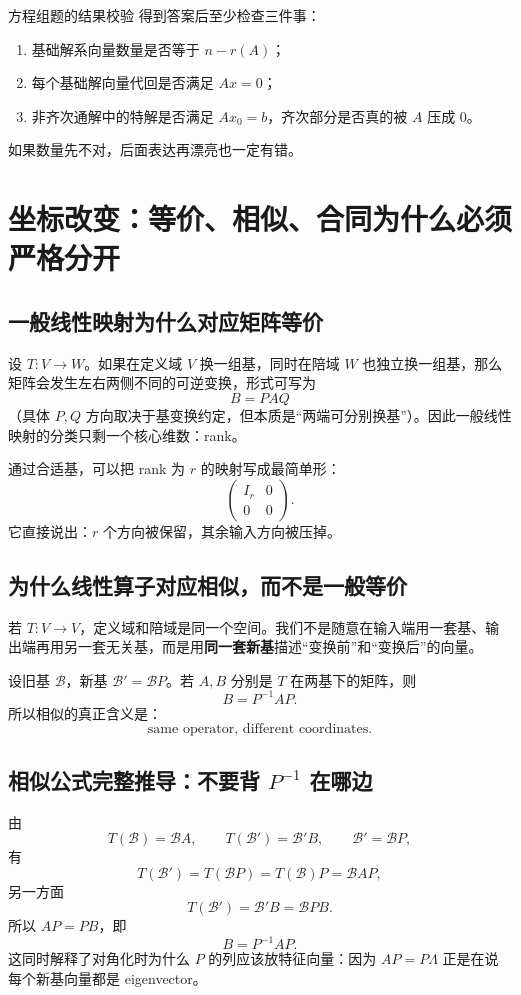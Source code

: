\documentclass[11pt,a4paper,openany]{ctexbook}
\newcommand{\key}[1]{\textbf{\color{deep}#1}}
\begin{document}
\begin{examBox}{方程组题的结果校验}
得到答案后至少检查三件事：
\begin{enumerate}
  \item 基础解系向量数量是否等于 $n-r(A)$；
  \item 每个基础解向量代回是否满足 $Ax=0$；
  \item 非齐次通解中的特解是否满足 $Ax_0=b$，齐次部分是否真的被 $A$ 压成 0。
\end{enumerate}
如果数量先不对，后面表达再漂亮也一定有错。
\end{examBox}

\chapter{坐标改变：等价、相似、合同为什么必须严格分开}

\section{一般线性映射为什么对应矩阵等价}
设 $T:V\to W$。如果在定义域 $V$ 换一组基，同时在陪域 $W$ 也独立换一组基，那么矩阵会发生左右两侧不同的可逆变换，形式可写为
\[
B=PAQ
\]
（具体 $P,Q$ 方向取决于基变换约定，但本质是“两端可分别换基”）。因此一般线性映射的分类只剩一个核心维数：rank。

通过合适基，可以把 rank 为 $r$ 的映射写成最简单形：
\[
\boxed{
\begin{pmatrix}
I_r&0\\0&0
\end{pmatrix}}.
\]
它直接说出：$r$ 个方向被保留，其余输入方向被压掉。

\section{为什么线性算子对应相似，而不是一般等价}
若 $T:V\to V$，定义域和陪域是同一个空间。我们不是随意在输入端用一套基、输出端再用另一套无关基，而是用\key{同一套新基}描述“变换前”和“变换后”的向量。

设旧基 $\mathcal B$，新基 $\mathcal B'=\mathcal BP$。若 $A,B$ 分别是 $T$ 在两基下的矩阵，则
\[
\boxed{B=P^{-1}AP}.
\]
所以相似的真正含义是：
\[
\boxed{\text{same operator, different coordinates}.}
\]

\section{相似公式完整推导：不要背 \texorpdfstring{$P^{-1}$}{P inverse} 在哪边}
由
\[
T(\mathcal B)=\mathcal BA,\qquad T(\mathcal B')=\mathcal B'B,\qquad \mathcal B'=\mathcal BP,
\]
有
\[
T(\mathcal B')=T(\mathcal BP)=T(\mathcal B)P=\mathcal BAP,
\]
另一方面
\[
T(\mathcal B')=\mathcal B'B=\mathcal BPB.
\]
所以 $AP=PB$，即
\[
\boxed{B=P^{-1}AP}.
\]
这同时解释了对角化时为什么 $P$ 的列应该放特征向量：因为 $AP=P\Lambda$ 正是在说每个新基向量都是 eigenvector。
\end{document}
